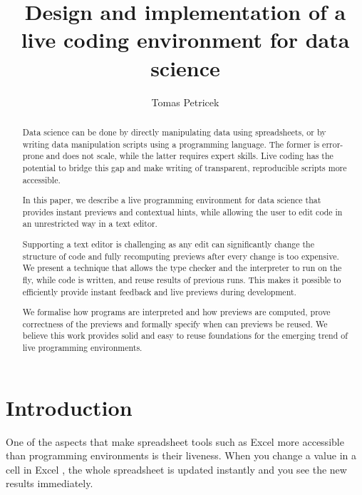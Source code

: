 \documentclass[sigplan,10pt]{acmart}\settopmatter{printfolios=true,printccs=false,printacmref=false}
\title{Design and implementation of a live coding environment for data science}
\author{Tomas Petricek}
\theoremstyle{plain}
\theoremstyle{definition}
\begin{document}
\begin{abstract}
Data science can be done by directly manipulating data using spreadsheets, or by writing 
data manipulation scripts using a programming language. The former is error-prone and
does not scale, while the latter requires expert skills. Live coding has the potential to 
bridge this gap and make writing of transparent, reproducible scripts more accessible.

In this paper, we describe a live programming environment for data science that provides instant 
previews and contextual hints, while allowing the user to edit code in an unrestricted way in
a text editor. 

Supporting a text editor is challenging as any edit can significantly change the structure of code and
fully recomputing previews after every change is too expensive. We present a technique that allows the type
checker and the interpreter to run on the fly, while code is written, and reuse results of previous 
runs. This makes it possible to efficiently provide instant feedback and live previews during development.

We formalise how programs are interpreted and how previews are computed, prove correctness
of the previews and formally specify when can previews be reused. We believe this work provides
solid and easy to reuse foundations for the emerging trend of live programming environments.
\end{abstract}
\maketitle


\section{Introduction}
\label{sec:intro}

One of the aspects that make spreadsheet tools such as Excel more accessible than programming 
environments is their liveness. When you change a value in a cell in Excel \cite{spreadsheet}, the  
whole spreadsheet is updated instantly and you see the new results immediately.
\end{document}
